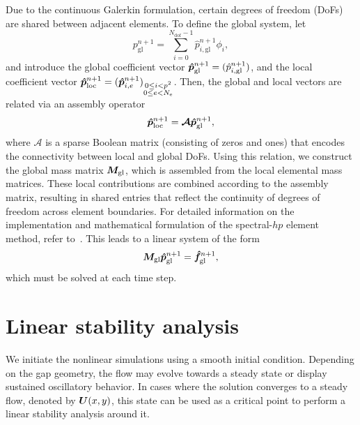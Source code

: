 \documentclass[../main.tex]{subfiles}
\begin{document}
Due to the continuous Galerkin formulation, certain degrees of freedom (DoFs) are shared between adjacent elements. To define the global system, let
\begin{equation}
	p_\text{gl}^{n+1} = \sum_{i=0}^{N_\text{dof}-1} \hat{p}_{i,\text{gl}}^{n+1} \phi_i,
\end{equation}
and introduce the global coefficient vector $\bm{\hat{p}}_\text{gl}^{n+1} = (\hat{p}_{i,\text{gl}}^{n+1})$, and the local coefficient vector $\bm{\hat{p}}_{\text{loc}}^{n+1} = (\bm{\hat{p}}_{i,e}^{n+1})_{\substack{0 \leq i < p^2\\0 \leq e < N_\text{e}}}$. Then, the global and local vectors are related via an assembly operator
\begin{equation}
	\bm{\hat{p}}_\text{loc}^{n+1} = \bm{\mathcal{A}} \bm{\hat{p}}_{\text{gl}}^{n+1},
	\label{eq:globalpressure}
\end{equation}
where $\bm{\mathcal{A}}$ is a sparse Boolean matrix (consisting of zeros and ones) that encodes the connectivity between local and global DoFs. Using this relation, we construct the global mass matrix $\bm{M}_\text{gl}$, which is assembled from the local elemental mass matrices. These local contributions are combined according to the assembly matrix, resulting in shared entries that reflect the continuity of degrees of freedom across element boundaries. For detailed information on the implementation and mathematical formulation of the spectral-$hp$ element method, refer to~\cite{spectralhpSpencerBible}. This leads to a linear system of the form
\begin{equation}
\bm{M}_\text{gl} \bm{\hat{p}}_\text{gl}^{n+1} = \bm{\hat{f}}_\text{gl}^{n+1},
\end{equation}
which must be solved at each time step.


\section{Linear stability analysis}\label{sec:lst}

We initiate the nonlinear simulations using a smooth initial condition. Depending on the gap geometry, the flow may evolve towards a steady state or display sustained oscillatory behavior. In cases where the solution converges to a steady flow, denoted by $\bm{U}(x, y)$, this state can be used as a critical point to perform a linear stability analysis around it.
\end{document}
